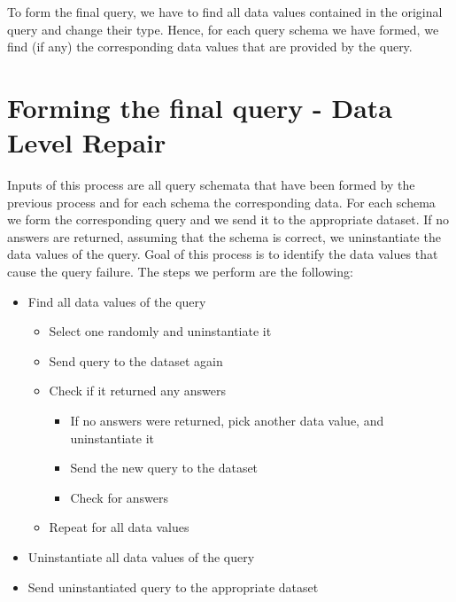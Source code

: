 \documentclass[a4paper,10pt]{article}
\begin{document}
To form the final query, we have to find all data values contained in the original query and change their type. 
Hence, for each query schema we have formed, we find (if any) the corresponding data values that are provided by the query.


\section{Forming the final query - Data Level Repair}

Inputs of this process are all query schemata that have been formed by the previous process and for each schema the corresponding data.
For each schema we form the corresponding query and we send it to the appropriate dataset. If no answers are returned, assuming that the schema is 
correct, we  uninstantiate the data values of the query.  Goal of this process is to identify the data values that cause the query failure. 
The steps we perform are the following:

\begin{itemize}
 \item Find all data values of the query
    \begin{itemize}
    \item Select one randomly and uninstantiate it
   \item Send query to the dataset again
    \item Check if it returned any answers
	\begin{itemize}
	
	\item If no answers were returned, pick another data value, and uninstantiate it 
	  \item Send the new query to the dataset
	  \item Check for answers
	\end{itemize}
      \item Repeat for all data values
      \end{itemize}

    \item Uninstantiate all data values of the query
    \item Send uninstantiated query to the appropriate dataset
      
\end{itemize}
\end{document}
